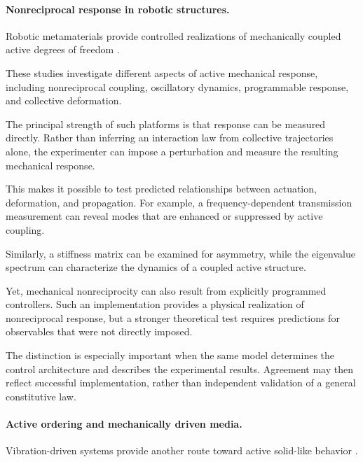 \paragraph*{Nonreciprocal response in robotic structures.}

Robotic metamaterials
provide controlled
realizations of
mechanically coupled
active degrees of freedom
\cite{Baconnier2022tensioncontrolledc,Brandenbourger2019nonreciprocalrobot,Du2026metamaterialsthatl,Brandenbourger2021limitcyclesturnac,Binysh2026moreislessinunpe,Coulais2025activemetamaterials,Chen2020selfsensingmetamat}.

These studies investigate
different aspects of
active mechanical
response, including
nonreciprocal coupling,
oscillatory dynamics,
programmable response,
and collective deformation.

The principal strength
of such platforms is
that response can be
measured directly.
Rather than inferring
an interaction law
from collective
trajectories alone,
the experimenter
can impose a
perturbation and
measure the resulting
mechanical response.

This makes it possible
to test predicted
relationships between
actuation, deformation,
and propagation.
For example, a
frequency-dependent
transmission measurement
can reveal modes
that are enhanced
or suppressed by
active coupling.

Similarly, a stiffness
matrix can be examined
for asymmetry, while
the eigenvalue spectrum
can characterize the
dynamics of a coupled
active structure.

Yet, mechanical
nonreciprocity can
also result from
explicitly programmed
controllers. Such
an implementation
provides a physical
realization of
nonreciprocal response,
but a stronger
theoretical test
requires predictions
for observables
that were not
directly imposed.

The distinction
is especially
important when
the same model
determines the
control architecture
and describes the
experimental results.
Agreement may then
reflect successful
implementation,
rather than
independent validation
of a general
constitutive law.

\paragraph*{Active ordering and mechanically driven media.}

Vibration-driven
systems provide another
route toward active
solid-like behavior
\cite{Antonov2025selfsustainedfrict,Baconnier2022selectiveandcollec,Wang2025hyperuniformnetwork,Wagner2026geometryinducedtra}.

